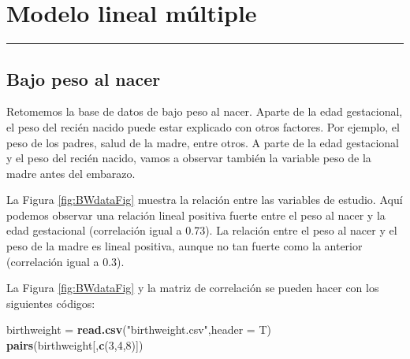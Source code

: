 \documentclass[
]{article}
\newenvironment{Shaded}{\begin{snugshade}}{\end{snugshade}}
\newcommand{\AttributeTok}[1]{\textcolor[rgb]{0.13,0.29,0.53}{#1}}
\newcommand{\DecValTok}[1]{\textcolor[rgb]{0.00,0.00,0.81}{#1}}
\newcommand{\FunctionTok}[1]{\textcolor[rgb]{0.13,0.29,0.53}{\textbf{#1}}}
\newcommand{\NormalTok}[1]{#1}
\newcommand{\OtherTok}[1]{\textcolor[rgb]{0.56,0.35,0.01}{#1}}
\newcommand{\StringTok}[1]{\textcolor[rgb]{0.31,0.60,0.02}{#1}}
\begin{document}
\hypertarget{modelo-lineal-muxfaltiple}{%
\section{Modelo lineal múltiple}\label{modelo-lineal-muxfaltiple}}

\rule{\textwidth}{0.4pt}

\hypertarget{bajo-peso-al-nacer}{%
\subsection*{Bajo peso al nacer}\label{bajo-peso-al-nacer}}

Retomemos la base de datos de bajo peso al nacer. Aparte de la edad gestacional, el peso del recién nacido puede estar explicado con otros factores. Por ejemplo, el peso de los padres, salud de la madre, entre otros. A parte de la edad gestacional y el peso del recién nacido, vamos a observar también la variable peso de la madre antes del embarazo.

La Figura \ref{fig:BWdataFig} muestra la relación entre las variables de estudio. Aquí podemos observar una relación lineal positiva fuerte entre el peso al nacer y la edad gestacional (correlación igual a 0.73). La relación entre el peso al nacer y el peso de la madre es lineal positiva, aunque no tan fuerte como la anterior (correlación igual a 0.3).

La Figura \ref{fig:BWdataFig} y la matriz de correlación se pueden hacer con los siguientes códigos:

\begin{Shaded}
\begin{Highlighting}[]
\NormalTok{birthweight }\OtherTok{=} \FunctionTok{read.csv}\NormalTok{(}\StringTok{"birthweight.csv"}\NormalTok{,}\AttributeTok{header =}\NormalTok{ T)}
\FunctionTok{pairs}\NormalTok{(birthweight[,}\FunctionTok{c}\NormalTok{(}\DecValTok{3}\NormalTok{,}\DecValTok{4}\NormalTok{,}\DecValTok{8}\NormalTok{)])}
\end{Highlighting}
\end{Shaded}
\end{document}
